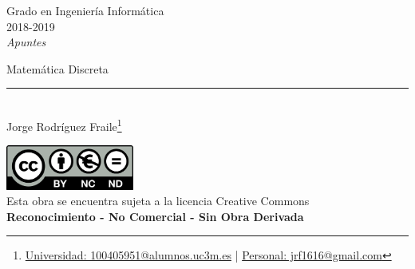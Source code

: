 \documentclass[12pt, twoside, openright]{report} %
\begin{document}
	
\begin{titlepage}
	\begin{sffamily}
	\color{azulUC3M}
	\begin{center}
		\begin{figure}[H] %
		\end{figure}
		\vspace{2.5cm}
		\begin{Large}
			Grado en Ingeniería Informática\\			
			2018-2019\\
			\vspace{2cm}		
			\textsl{Apuntes}\\
			\bigskip
		\end{Large}
		 	{\Huge Matemática Discreta}\\
		 	\vspace*{0.5cm}
	 		\rule{10.5cm}{0.1mm}\\
			\vspace*{0.9cm}
			{\LARGE Jorge Rodríguez Fraile\footnote{\href{mailto:100405951@alumnos.uc3m.es}{Universidad: 100405951@alumnos.uc3m.es}  |  \href{mailto:jrf1616@gmail.com}{Personal: jrf1616@gmail.com}}}\\ 
			\vspace*{1cm}
	\end{center}
	\vfill
	\color{black}
		\includegraphics[width=4.2cm]{img/creativecommons.png}\\
		Esta obra se encuentra sujeta a la licencia Creative Commons\\ \textbf{Reconocimiento - No Comercial - Sin Obra Derivada}
	\end{sffamily}
\end{titlepage}


\tableofcontents
\thispagestyle{fancy}
\end{document}
